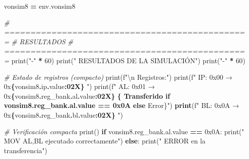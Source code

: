 \documentclass[12pt,oneside]{templates/unerthesis}
\newenvironment{Shaded}{\begin{snugshade}}{\end{snugshade}}
\newcommand{\BaseNTok}[1]{\textcolor[rgb]{0.00,0.00,0.81}{#1}}
\newcommand{\BuiltInTok}[1]{#1}
\newcommand{\CharTok}[1]{\textcolor[rgb]{0.31,0.60,0.02}{#1}}
\newcommand{\CommentTok}[1]{\textcolor[rgb]{0.56,0.35,0.01}{\textit{#1}}}
\newcommand{\ControlFlowTok}[1]{\textcolor[rgb]{0.13,0.29,0.53}{\textbf{#1}}}
\newcommand{\DecValTok}[1]{\textcolor[rgb]{0.00,0.00,0.81}{#1}}
\newcommand{\ErrorTok}[1]{\textcolor[rgb]{0.64,0.00,0.00}{\textbf{#1}}}
\newcommand{\NormalTok}[1]{#1}
\newcommand{\OperatorTok}[1]{\textcolor[rgb]{0.81,0.36,0.00}{\textbf{#1}}}
\newcommand{\SpecialCharTok}[1]{\textcolor[rgb]{0.81,0.36,0.00}{\textbf{#1}}}
\newcommand{\SpecialStringTok}[1]{\textcolor[rgb]{0.31,0.60,0.02}{#1}}
\newcommand{\StringTok}[1]{\textcolor[rgb]{0.31,0.60,0.02}{#1}}
\begin{document}
\begin{Shaded}
\begin{Highlighting}[]
\NormalTok{    vonsim8 }\OperatorTok{=}\NormalTok{ env.vonsim8}
    
    \CommentTok{\# ===============================================}
    \CommentTok{\# RESULTADOS}
    \CommentTok{\# ===============================================}
    \BuiltInTok{print}\NormalTok{(}\StringTok{"{-}"} \OperatorTok{*} \DecValTok{60}\NormalTok{)}
    \BuiltInTok{print}\NormalTok{(}\StringTok{"  RESULTADOS DE LA SIMULACIÓN"}\NormalTok{)}
    \BuiltInTok{print}\NormalTok{(}\StringTok{"{-}"} \OperatorTok{*} \DecValTok{60}\NormalTok{)}
    
    \CommentTok{\# Estado de registros (compacto)}
    \BuiltInTok{print}\NormalTok{(}\SpecialStringTok{f"}\CharTok{\textbackslash{}n}\SpecialStringTok{  Registros:"}\NormalTok{)}
    \BuiltInTok{print}\NormalTok{(}\SpecialStringTok{f"    IP:  0x00 → 0x}\SpecialCharTok{\{}\NormalTok{vonsim8}\SpecialCharTok{.}\NormalTok{ip}\SpecialCharTok{.}\NormalTok{value}\SpecialCharTok{:02X\}}\SpecialStringTok{  "}\NormalTok{)}
    \BuiltInTok{print}\NormalTok{(}\SpecialStringTok{f"    AL:  0x01 → 0x}\SpecialCharTok{\{}\NormalTok{vonsim8}\SpecialCharTok{.}\NormalTok{reg\_bank}\SpecialCharTok{.}\NormalTok{al}\SpecialCharTok{.}\NormalTok{value}\SpecialCharTok{:02X\}}\SpecialStringTok{ }
\ErrorTok{    \{\textquotesingle{} Transferido\textquotesingle{} if vonsim8.reg\_bank.al.value == 0x0A }
    \ControlFlowTok{else} \StringTok{\textquotesingle{} Error\textquotesingle{}}\NormalTok{\}}\StringTok{")}
\ErrorTok{    print}\NormalTok{(}\SpecialStringTok{f"    BL:  0x0A → 0x}\SpecialCharTok{\{}\NormalTok{vonsim8}\SpecialCharTok{.}\NormalTok{reg\_bank}\SpecialCharTok{.}\NormalTok{bl}\SpecialCharTok{.}\NormalTok{value}\SpecialCharTok{:02X\}}\SpecialStringTok{  "}\NormalTok{)}
    
    \CommentTok{\# Verificación compacta}
    \BuiltInTok{print}\NormalTok{()}
    \ControlFlowTok{if}\NormalTok{ vonsim8.reg\_bank.al.value }\OperatorTok{==} \BaseNTok{0x0A}\NormalTok{:}
        \BuiltInTok{print}\NormalTok{(}\StringTok{"  MOV AL,BL ejecutado correctamente"}\NormalTok{)}
    \ControlFlowTok{else}\NormalTok{:}
        \BuiltInTok{print}\NormalTok{(}\StringTok{"  ERROR en la transferencia"}\NormalTok{)}
    

\end{Highlighting}
\end{Shaded}
\end{document}
